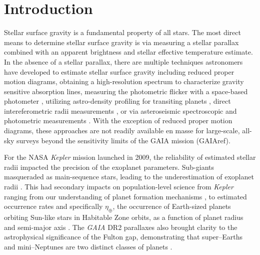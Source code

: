 \chapter{Introduction} \label{chap:introduction}

Stellar surface gravity is a fundamental property of all stars. The most direct means to determine stellar surface gravity is via measuring a stellar parallax combined with an apparent brightness and stellar effective temperature estimate\citep[e.g., the GAIA mission,]{Prusti2016,Brown2016,Lindegren2016,Stassun2016}. In the absence of a stellar parallax, there are multiple techniques astronomers have developed to estimate stellar surface gravity including reduced proper motion diagrams\citep{Lepine2011,Gould2003}, obtaining a high-resolution spectrum to characterize gravity sensitive absorption lines, measuring the photometric flicker with a space-based photometer \citep{Bastien2013,Bastien2016}, utilizing astro-density profiling for transiting planets \citep{Kipping2014}, direct intereferometric radii measurements \citep{Boyajian2012}, or via asteroseismic spectroscopic and photometric measurements \citep{Huber2014}. With the exception of reduced proper motion diagrams, these approaches are not readily available en masse for large-scale, all-sky surveys beyond the sensitivity limits of the GAIA mission (GAIAref).

For the NASA \textit{Kepler} mission launched in 2009, the reliability of estimated stellar radii impacted the precision of the exoplanet parameters. Sub-giants masqueraded as main-sequence stars, leading to the underestimation of exoplanet radii \citep{Plavchan2014,Kane2014,Howell2014,Bastien2014,Mann2012}. This had secondary impacts on population-level science from \textit{Kepler} ranging from our understanding of planet formation mechanisms \citep[e.g., the transition from terrestrial to Neptune-like worlds, ][]{Rogers2015}, to estimated occurrence rates and specifically $\eta_\oplus$, the occurrence of Earth-sized planets orbiting Sun-like stars in Habitable Zone orbits, as a function of planet radius and semi-major axis \citep{ETAEARTHREFS-BRADHANSEN-JESSIECHRISTIANSEN}. The \textit{GAIA} DR2 parallaxes also brought clarity to the astrophysical significance of the Fulton gap, demonstrating that super--Earths and mini--Neptunes are two distinct classes of planets \citep{FULTONREFS}.

